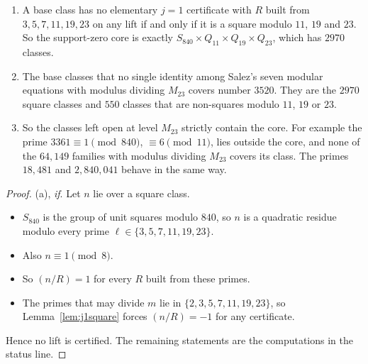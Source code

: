 \begin{theorem}\label{thm:termcore}
\begin{enumerate}[label=(\alph*)]
\item A base class has no elementary $j=1$ certificate with $R$ built from $3,5,7,11,19,23$ on any lift if and only if it is a square modulo $11$, $19$ and $23$. So the support-zero core is exactly $S_{840}\times Q_{11}\times Q_{19}\times Q_{23}$, which has $2970$ classes.
\item The base classes that no single identity among Salez's seven modular equations \cite{Salez} with modulus dividing $M_{23}$ covers number $3520$. They are the $2970$ square classes and $550$ classes that are non-squares modulo $11$, $19$ or $23$.
\item So the classes left open at level $M_{23}$ strictly contain the core. For example the prime $3361\equiv1\pmod{840}$, $\equiv6\pmod{11}$, lies outside the core, and none of the $64{,}149$ families with modulus dividing $M_{23}$ covers its class. The primes $18{,}481$ and $2{,}840{,}041$ behave in the same way.
\end{enumerate}
\end{theorem}
\begin{proof}
(a), \emph{if}. Let $n$ lie over a square class.
\begin{itemize}
\item $S_{840}$ is the group of unit squares modulo $840$, so $n$ is a quadratic residue modulo every prime $\ell\in\{3,5,7,11,19,23\}$.
\item Also $n\equiv1\pmod8$.
\item So $(n/R)=1$ for every $R$ built from these primes.
\item The primes that may divide $m$ lie in $\{2,3,5,7,11,19,23\}$, so Lemma~\ref{lem:j1square} forces $(n/R)=-1$ for any certificate.
\end{itemize}
Hence no lift is certified. The remaining statements are the computations in the status line.
\end{proof}

